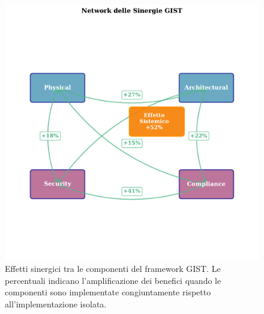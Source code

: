\begin{figure}[htbp]
\centering
\includegraphics[width=1.1\textwidth]{thesis_figures/cap5/figura_5_2_synergies.pdf}



\caption[Effetti sinergici tra le componenti del framework GIST]{Effetti sinergici tra le componenti del framework GIST. Le percentuali indicano l'amplificazione dei benefici quando le componenti sono implementate congiuntamente rispetto all'implementazione isolata.}
\label{fig:synergies}
\end{figure}

